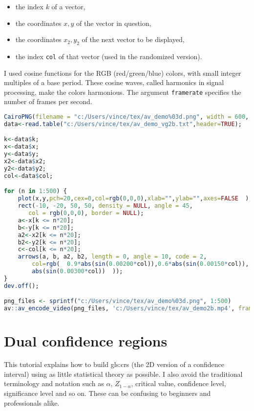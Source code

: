 \documentclass[oneside,10pt]{book}
\begin{document}
\begin{itemize} 
\item the index $k$ of a vector,
\item the coordinates $x, y$ of the vector in question,
\item the coordinates $x_2, y_2$ of the next vector to be displayed,
\item the index \texttt{col} of that vector (used in the randomized version).
\end{itemize}
\noindent I used cosine functions for the RGB (red/green/blue) colors, with small integer multiples of a base period. These cosine waves, called harmonics in signal processing, make the colors harmonious. The argument \texttt{framerate} specifies the number of frames per second. \\

\begin{lstlisting}[language=R]
CairoPNG(filename = "c:/Users/vince/tex/av_demo%03d.png", width = 600, height = 600);  
data<-read.table("c:/Users/vince/tex/av_demo_vg2b.txt",header=TRUE);

k<-data$k;
x<-data$x;   
y<-data$y;  
x2<-data$x2;   
y2<-data$y2; 
col<-data$col; 

for (n in 1:500) {
    plot(x,y,pch=20,cex=0,col=rgb(0,0,0),xlab="",ylab="",axes=FALSE  );
    rect(-10, -20, 50, 50, density = NULL, angle = 45,
       col = rgb(0,0,0), border = NULL);
    a<-x[k <= n*20];
    b<-y[k <= n*20];
    a2<-x2[k <= n*20];
    b2<-y2[k <= n*20];
    c<-col[k <= n*20];
    arrows(a, b, a2, b2, length = 0, angle = 10, code = 2,
        col=rgb(  0.9*abs(sin(0.00200*col)),0.6*abs(sin(0.00150*col)),
        abs(sin(0.00300*col))  ));
}
dev.off();

png_files <- sprintf("c:/Users/vince/tex/av_demo%03d.png", 1:500)
av::av_encode_video(png_files, 'c:/Users/vince/tex/av_demo2b.mp4', framerate = 12)
\end{lstlisting}








\section{Dual confidence regions}\label{dualcr1wqa}

This tutorial explains how to build \glspl{gls:cr} (the 2D version of a confidence interval) using as little statistical theory as possible. I also avoid the traditional terminology and notation such as $\alpha$, $Z_{1-\alpha}$, critical value, confidence level, significance level and so on. These can be confusing to beginners and professionals alike.
\end{document}
